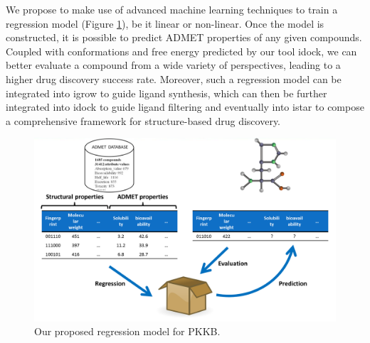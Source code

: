 We propose to make use of advanced machine learning techniques to train a regression model (Figure \ref{PKKB:Regression}), be it linear or non-linear. Once the model is constructed, it is possible to predict ADMET properties of any given compounds. Coupled with conformations and free energy predicted by our tool idock, we can better evaluate a compound from a wide variety of perspectives, leading to a higher drug discovery success rate. Moreover, such a regression model can be integrated into igrow to guide ligand synthesis, which can then be further integrated into idock to guide ligand filtering and eventually into istar to compose a comprehensive framework for structure-based drug discovery.

\begin{figure}
\centering
\includegraphics[width=\linewidth]{PKKB/Regression.png}
\caption{Our proposed regression model for PKKB.}
\label{PKKB:Regression}
\end{figure}

\fi

\chapterend

